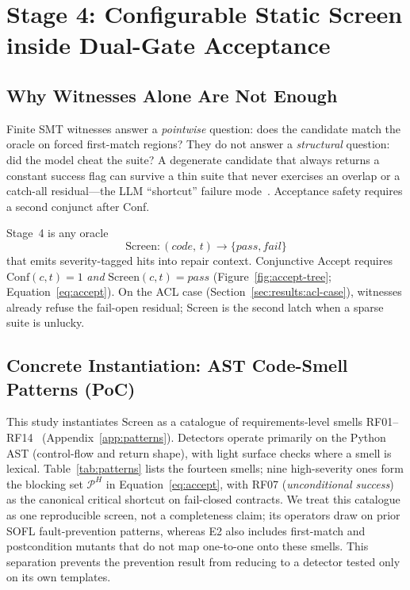\section{Stage 4: Configurable Static Screen inside Dual-Gate Acceptance}
\label{sec:method:screen}
\label{sec:method:guard}

\subsection{Why Witnesses Alone Are Not Enough}
\label{subsec:method:why-screen}

Finite SMT witnesses answer a \emph{pointwise} question: does the candidate
match the oracle on forced first-match regions?
They do not answer a \emph{structural} question: did the model cheat the suite?
A degenerate candidate that always returns a constant success flag can survive
a thin suite that never exercises an overlap or a catch-all residual---the
LLM ``shortcut'' failure mode~\cite{dakhel2023copilot,hovemeyer2004findbugs}.
Acceptance safety requires a second conjunct after Conf.

Stage~4 is any oracle
\begin{equation}
  \mathrm{Screen} : (\mathit{code},\, t) \longrightarrow
  \{\mathit{pass},\mathit{fail}\}
\end{equation}
that emits severity-tagged hits into repair context.
Conjunctive Accept requires
$\mathrm{Conf}(c,t){=}1$ \emph{and}
$\mathrm{Screen}(c,t){=}\mathit{pass}$
(Figure~\ref{fig:accept-tree}; Equation~\eqref{eq:accept}).
On the ACL case (Section~\ref{sec:results:acl-case}), witnesses already refuse
the fail-open residual; Screen is the second latch when a sparse suite is
unlucky.

\subsection{Concrete Instantiation: AST Code-Smell Patterns (PoC)}
\label{subsec:method:smell-poc}

This study instantiates $\mathrm{Screen}$ as a catalogue of
requirements-level smells RF01--RF14~\citep{li2023iet_faultprevention}
(Appendix~\ref{app:patterns}).
Detectors operate primarily on the Python AST (control-flow and return shape),
with light surface checks where a smell is lexical.
Table~\ref{tab:patterns} lists the fourteen smells; nine high-severity ones
form the blocking set $\mathcal{P}^H$ in Equation~\eqref{eq:accept}, with RF07
(\emph{unconditional success}) as the canonical critical shortcut on
fail-closed contracts.
We treat this catalogue as one reproducible screen, not a completeness claim;
its operators draw on prior SOFL fault-prevention patterns, whereas
E2 also includes first-match and postcondition mutants that do not map
one-to-one onto these smells.
This separation prevents the prevention result from reducing to a detector
tested only on its own templates.

